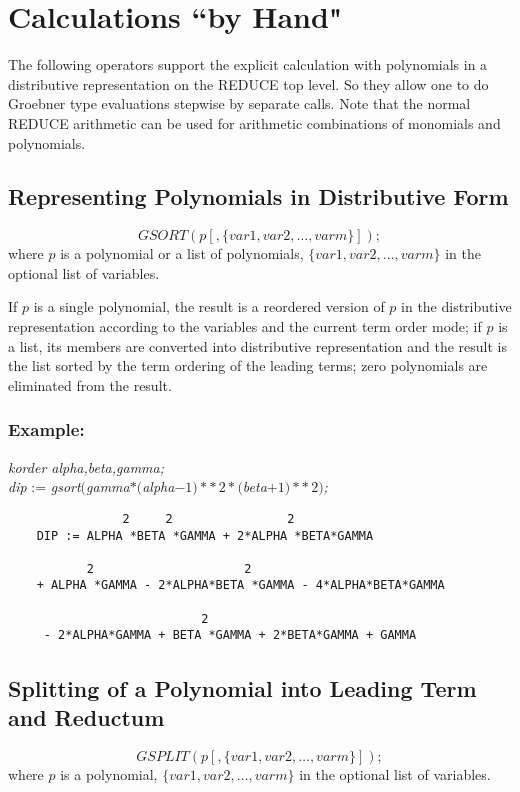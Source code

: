 \section{Calculations ``by Hand"}
The following operators support the explicit calculation with
polynomials in a distributive representation on the REDUCE top level.
So they allow one to do Groebner type evaluations stepwise by
separate calls. Note that the normal REDUCE arithmetic can be used
for arithmetic combinations of monomials and polynomials.

\subsection{Representing Polynomials in Distributive Form}
\[
 GSORT (p[,\{var1, var2, \ldots , varm\}]);
\]
where $p$ is a polynomial or a list of polynomials, $\{var1, var2,
\ldots , varm\}$ in the optional list of variables.

If $p$ is a single polynomial, the result is a reordered version of $p$
in the distributive representation according to the variables and the
current term order mode; if $p$ is a list, its members are converted
into distributive representation and the result is the list sorted by
the term ordering of the leading terms; zero polynomials are
eliminated from the result.

\subsubsection*{Example:}

{\it korder alpha,beta,gamma;}\\
{\it dip} := {\it  gsort$($gamma$*($alpha$-1)**\,2
*($beta$+1)**\,2)$;}


\begin{verbatim}
                2     2                2
    DIP := ALPHA *BETA *GAMMA + 2*ALPHA *BETA*GAMMA

           2                     2
    + ALPHA *GAMMA - 2*ALPHA*BETA *GAMMA - 4*ALPHA*BETA*GAMMA

                           2
     - 2*ALPHA*GAMMA + BETA *GAMMA + 2*BETA*GAMMA + GAMMA

 \end{verbatim}

\subsection{Splitting of a Polynomial into Leading Term and
Reductum}
\[
GSPLIT (p[,\{var1, var2,\ldots ,varm\}]);
\]
where $p$ is a polynomial, $\{var1, var2, \ldots , varm\}$ in the
optional list of variables.

